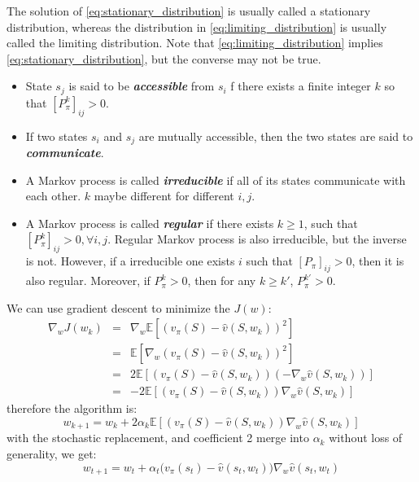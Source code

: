 \documentclass[10pt]{elegantbook}
\newcommand{\mydefination}[1]{\textbf{\textit{\textcolor{structurecolor}{#1}}}}
\begin{document}
\begin{definition}
    The solution of \ref{eq:stationary_distribution} is usually called a stationary distribution, whereas the distribution
in \ref{eq:limiting_distribution} is usually called the limiting distribution. Note that \ref{eq:limiting_distribution} implies \ref{eq:stationary_distribution}, 
but the converse may not be true. 

    \begin{itemize}
        \item State $s_j$ is said to be \mydefination{accessible} from $s_i$ f there exists a finite integer $k$
so that $[P^k_{\pi}]_{ij} > 0$.
        \item If two states $s_i$ and $s_j$ are mutually accessible, then the two states are said to \mydefination{communicate}.
        \item A Markov process is called \mydefination{irreducible} if all of its states communicate with each other. $k$ maybe different for different $i,j$.
        \item A Markov process is called \mydefination{regular} if there exists $k \geq 1$, such that $[P^k_{\pi}]_{ij} > 0, \forall i, j$. Regular Markov process
        is also irreducible, but the inverse is not. However, if a irreducible one exists $i$ such that $[P_{\pi}]_{ij} > 0$, then it is also regular. Moreover, 
        if $P^{k}_{\pi} > 0$, then for any $k \geq k'$, $P^{k'}_{\pi} > 0$.
    \end{itemize}
\end{definition}

We can use gradient descent to minimize the $J(w)$:
\[
\begin{array}{lll}
    \nabla_{w}J(w_{k})&=&\nabla_{w}\mathbb{E}[(v_{\pi}(S)-\hat{v}(S,w_{k}))^{2}] \\ 
    &=& \mathbb{E}[ \nabla_{w} (v_{\pi}(S)-\hat{v}(S,w_{k}))^{2} ] \\
    &=& 2\mathbb{E}[(v_{\pi}(S)-\hat{v}(S,w_{k}))(-\nabla_{w}\hat{v}(S,w_{k}))]\\ 
    &=& -2\mathbb{E}[(v_{\pi}(S)-\hat{v}(S,w_{k}))\nabla_{w}\hat{v}(S,w_{k})]
\end{array}
\]
therefore the algorithm is:
\begin{equation}
    w_{k+1}=w_{k}+2\alpha_{k}\mathbb{E}[(v_{\pi}(S)-\hat{v}(S,w_{k}))\nabla_{w}\hat{v}(S,w_{k})]
\end{equation}
with the stochastic replacement, and coefficient 2 merge into $\alpha_k$ without loss of generality, we get:
\begin{equation}
    w_{t+1}=w_{t}+\alpha_{t}\bigl(v_{\pi}(s_{t})-\hat{v}(s_{t},w_{t})\bigr)\nabla_{w}\hat{v}(s_{t},w_{t})
\end{equation}
\end{document}
